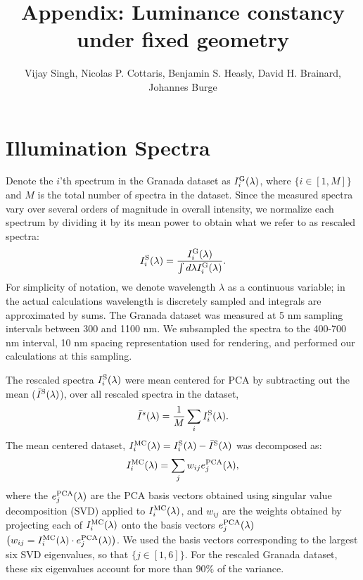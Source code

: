 \documentclass[10pt,english]{article}
\date{}
\begin{document}
\title{Appendix: Luminance constancy under fixed geometry}

\author{Vijay Singh, Nicolas P. Cottaris, Benjamin S. Heasly, David H. Brainard, Johannes Burge}
\maketitle



\section{Illumination Spectra}
Denote the $i$'th spectrum in the Granada dataset as $I^{\rm G}_i(\lambda)$, where $\{i \in [1,M]\}$ and $M$ is the total number of spectra in the dataset. 
Since the measured spectra vary over several orders of magnitude in overall intensity, we normalize each spectrum by dividing it by its mean power to obtain what we refer to as rescaled spectra:
\begin{align}
I_i^{\rm S}(\lambda) = \frac{I^{\rm G}_i(\lambda)}{\int d\lambda I^{\rm G}_i(\lambda)}.
\end{align}
For simplicity of notation, we denote wavelength $\lambda$ as a continuous variable; in the actual calculations wavelength is discretely sampled and integrals are approximated by sums. 
The Granada dataset was measured at 5 nm sampling intervals between 300 and 1100 nm.  
We subsampled the spectra to the 400-700 nm interval, 10 nm spacing representation used for rendering, and performed our calculations at this sampling.

The rescaled spectra $I_i^{\rm S}(\lambda)$ were mean centered for PCA by subtracting out the mean ($\bar{I}^{\rm S}(\lambda)$),  over all rescaled spectra in the dataset, 
\begin{align}
\bar{I}^{s}(\lambda) = \frac{1}{M}\sum_i{I_i^{\rm S}(\lambda)}.
\end{align} 
The mean centered dataset, $I_i^{\rm MC}(\lambda) = I_{i}^{\rm S}(\lambda) - \bar{I}^{\rm S}(\lambda)$
was decomposed as:
\begin{align}
I_i^{\rm MC}(\lambda) = \sum_j w_{ij} e_j^{\rm PCA}(\lambda),
\end{align}
where the $e_j^{\rm PCA}(\lambda)$ are the PCA basis vectors obtained using
singular value decomposition (SVD) applied to $I_i^{\rm MC}(\lambda)$, 
and $w_{ij}$ are the weights obtained by projecting each of $I_i^{\rm MC}(\lambda)$ onto the basis vectors $e_j^{\rm PCA}(\lambda)$ $\left( w_{ij} = I_i^{\rm MC}(\lambda)\cdot e_j^{\rm PCA}(\lambda)\right)$.
We used the basis vectors corresponding to
the largest six SVD eigenvalues, so that $\{j \in [1,6]\}$.
For the rescaled Granada dataset, these six  eigenvalues account for more than $90\%$ of the variance.
\end{document}
